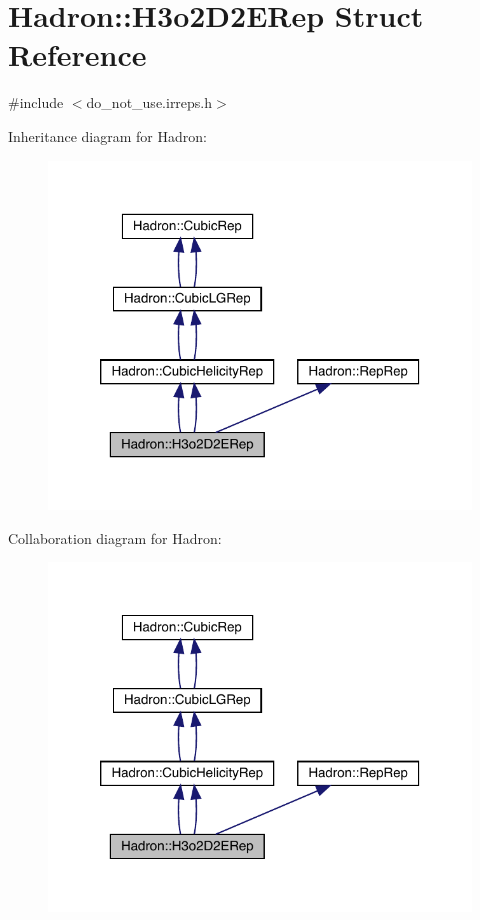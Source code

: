 \hypertarget{structHadron_1_1H3o2D2ERep}{}\section{Hadron\+:\+:H3o2\+D2\+E\+Rep Struct Reference}
\label{structHadron_1_1H3o2D2ERep}


{\ttfamily \#include $<$do\+\_\+not\+\_\+use.\+irreps.\+h$>$}



Inheritance diagram for Hadron\+:\nopagebreak
\begin{figure}[H]
\begin{center}
\leavevmode
\includegraphics[width=320pt]{d9/dd4/structHadron_1_1H3o2D2ERep__inherit__graph}
\end{center}
\end{figure}


Collaboration diagram for Hadron\+:\nopagebreak
\begin{figure}[H]
\begin{center}
\leavevmode
\includegraphics[width=320pt]{db/df6/structHadron_1_1H3o2D2ERep__coll__graph}
\end{center}
\end{figure}
